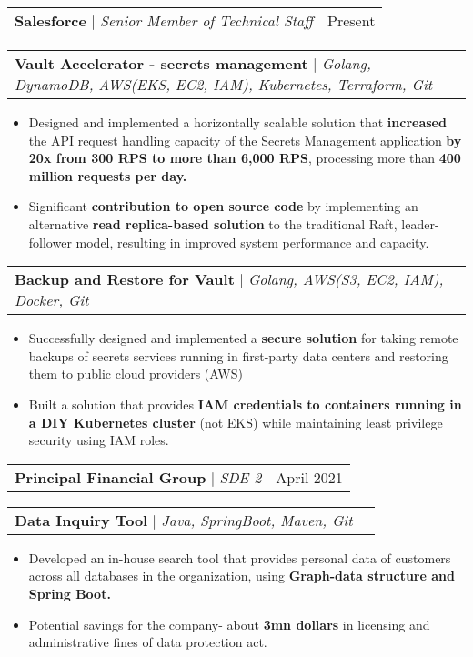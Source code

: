 \documentclass[letterpaper,11pt]{article}
\makeatletter
\newcommand{\resumeItem}[1]{
  \item\small{
    {#1 \vspace{-2pt}}
  }
}
\newcommand{\resumeProjectHeading}[2]{
    \item
    \begin{tabular*}{0.97\textwidth}{l@{\extracolsep{\fill}}r}
      \small#1 & #2 \\
    \end{tabular*}\vspace{-7pt}
}
\newcommand{\resumeItemListStart}{\begin{itemize}}
\newcommand{\resumeItemListEnd}{\end{itemize}\vspace{-5pt}}
\makeatother
\begin{document}
        \resumeProjectHeading
          {\textbf{\large Salesforce} $|$ \footnotesize\emph{Senior Member of Technical Staff}\vspace{3pt}}{Present}

        \resumeProjectHeading
        {\textbf{Vault Accelerator - secrets management} $|$ \footnotesize\emph{Golang, DynamoDB, AWS(EKS, EC2, IAM), Kubernetes, Terraform, Git}}{}
          \resumeItemListStart
            \resumeItem{Designed and implemented a horizontally scalable solution that \textbf{increased} the API request handling capacity of the Secrets Management application\textbf{ by 20x from 300 RPS to more than 6,000 RPS}, processing more than \textbf{400 million requests per day.}}
            \resumeItem{Significant \textbf{contribution to open source code} by implementing an alternative \textbf{read replica-based solution} to the traditional Raft, leader-follower model, resulting in improved system performance and capacity.}
        \resumeItemListEnd

        \resumeProjectHeading
        {\textbf{Backup and Restore for Vault} $|$ \footnotesize\emph{Golang, AWS(S3, EC2, IAM), Docker, Git}}{}
          \resumeItemListStart
            \resumeItem{Successfully designed and implemented a \textbf{secure solution} for taking remote backups of secrets services running in first-party data centers and restoring them to public cloud providers (AWS)}
            \resumeItem{Built a solution that provides \textbf{IAM credentials to containers running in a DIY Kubernetes cluster} (not EKS) while maintaining least privilege security using IAM roles.}\vspace{8pt}
        \resumeItemListEnd

         \resumeProjectHeading
          {\textbf{\large Principal Financial Group} $|$ \footnotesize\emph{SDE 2}\vspace{3pt}}{April 2021}

          
         \resumeProjectHeading
        {\textbf{Data Inquiry Tool} $|$ \footnotesize\emph{Java, SpringBoot, Maven, Git}}{}
          \resumeItemListStart
            \resumeItem{Developed an in-house search tool that provides personal data of customers across all databases in the organization, using \textbf{Graph-data structure and Spring Boot.}}
            \resumeItem{Potential savings for the company- about \textbf{3mn dollars} in licensing and administrative fines of data protection act.}\vspace{-15pt}
        \resumeItemListEnd
\end{document}
